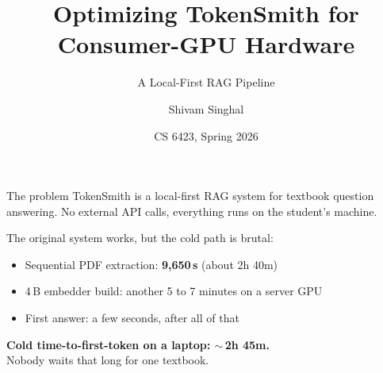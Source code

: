 \documentclass[aspectratio=169,11pt]{beamer}
\title[TokenSmith on Consumer GPUs]{Optimizing TokenSmith for Consumer-GPU Hardware}
\subtitle{A Local-First RAG Pipeline}
\author{Shivam Singhal}
\institute{Georgia Tech}
\date{CS 6423, Spring 2026}
\begin{document}
\begin{frame}
  \titlepage
\end{frame}

\begin{frame}{The problem}
TokenSmith is a local-first RAG system for textbook question answering.
No external API calls, everything runs on the student's machine.

\bigskip

The original system works, but the cold path is brutal:
\begin{itemize}
  \item Sequential PDF extraction: \textbf{9{,}650\,s} (about 2h 40m)
  \item 4\,B embedder build: another 5 to 7 minutes on a server GPU
  \item First answer: a few seconds, after all of that
\end{itemize}

\bigskip

\begin{block}{}
\centering
\textbf{Cold time-to-first-token on a laptop: $\sim$\,2h 45m.}\\
Nobody waits that long for one textbook.
\end{block}
\end{frame}
\end{document}
